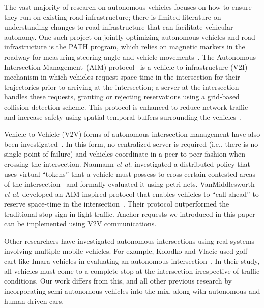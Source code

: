 The vast majority of research on autonomous vehicles focuses on how to
ensure they run on existing road infrastructure; there is limited
literature on understanding changes to road infrastructure that can
facilitate vehicular autonomy.  One such project on jointly optimizing
autonomous vehicles and road infrastructure is the PATH program, which
relies on magnetic markers in the roadway for measuring steering angle
and vehicle movements~\cite{bib:Shladover91Automated}.  The Autonomous
Intersection Management~(AIM) protocol~\cite{bib:Dresner08Multiagent, trr11,
bib:Quinlan10Bringing} is a vehicle-to-infrastructure (V2I) mechanism in
which vehicles request space-time in the intersection for their
trajectories prior to arriving at the intersection; a server at the
intersection handles these requests, granting or rejecting
reservations using a grid-based collision detection scheme. This
protocol is enhanced to reduce network traffic and increase safety
using spatial-temporal buffers surrounding the vehicles~\cite{trr11}.

Vehicle-to-Vehicle (V2V) forms of autonomous intersection management
have also been investigated~\cite{naumann97:intersection,
ATT08-vanmiddlesworth}.  In this form, no centralized server is
required (i.e., there is no single point of failure) and vehicles
coordinate in a peer-to-peer fashion when crossing the
intersection. Naumann {\em et al.} investigated a distributed policy
that uses virtual ``tokens'' that a vehicle must possess to cross
certain contested areas of the
intersection~\cite{naumann97:intersection} and formally evaluated it
using petri-nets.  VanMiddlesworth {\em et al.} developed an
AIM-inspired protocol that enables vehicles to ``call ahead'' to
reserve space-time in the
intersection~\cite{ATT08-vanmiddlesworth}. Their protocol outperformed
the traditional stop sign in light traffic. Anchor requests we
introduced in this paper can be implemented using V2V communications.


Other researchers have investigated autonomous intersections using
real systems involving multiple mobile vehicles.  For example, Kolodko
and Vlacic used golf-cart-like Imara vehicles in evaluating an
autonomous intersection~\cite{Kolodko03:INRIA}.  In their study, all
vehicles must come to a complete stop at the intersection irrespective
of traffic conditions.  Our work differs from this, and all other
previous research by incorporating semi-autonomous vehicles into the
mix, along with autonomous and human-driven cars.



